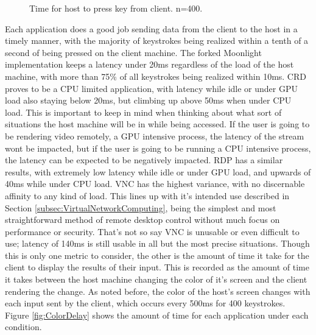\begin{figure}[h]
  \caption[Input Delay Data]{Time for host to press key from client. n=400.}
  \label{fig:InputDelay}
\end{figure}

Each application does a good job sending data from the client to the host in a timely manner, with the majority of keystrokes being realized within a tenth of a second of being pressed on the client machine.
The forked Moonlight implementation keeps a latency under 20ms regardless of the load of the host machine, with more than 75\% of all keystrokes being realized within 10ms.
CRD proves to be a CPU limited application, with latency while idle or under GPU load also staying below 20ms, but climbing up above 50ms when under CPU load.
This is important to keep in mind when thinking about what sort of situations the host machine will be in while being accessed.
If the user is going to be rendering video remotely, a GPU intensive process, the latency of the stream wont be impacted, but if the user is going to be running a CPU intensive process, the latency can be expected to be negatively impacted.
RDP has a similar results, with extremely low latency while idle or under GPU load, and upwards of 40ms while under CPU load.
VNC has the highest variance, with no discernable affinity to any kind of load.
This lines up with it's intended use described in Section \ref{subsec:VirtualNetworkComputing}, being the simplest and most straightforward method of remote desktop control without much focus on performance or security.
That's not so say VNC is unusable or even difficult to use; latency of 140ms is still usable in all but the most precise situations.
Though this is only one metric to consider, the other is the amount of time it take for the client to display the results of their input.
This is recorded as the amount of time it takes between the host machine changing the color of it's screen and the client rendering the change.
As noted before, the color of the host's screen changes with each input sent by the client, which occurs every 500ms for 400 keystrokes.
Figure \ref{fig:ColorDelay} shows the amount of time for each application under each condition.


